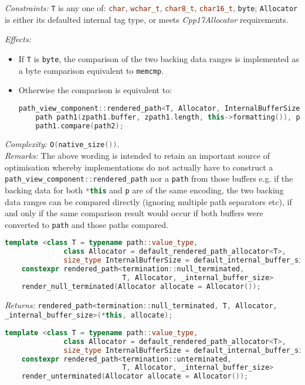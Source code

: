 \documentclass[11pt]{article}
\newcommand{\code}[2][cpp]{\lstinline[language=#1,basicstyle=\small\ttfamily]{#2}}
\newcommand{\desc}[1]{\textit{#1}}
\newcommand{\constraints}{\desc{Constraints: }}
\newcommand{\effects}{\desc{Effects: }}
\newcommand{\returns}{\desc{Returns: }}
\newcommand{\remarks}{\desc{Remarks: }}
\newcommand{\complexity}{\desc{Complexity: }}
\begin{document}
\constraints \code{T} is any one of: \code{char}, \code{wchar_t}, \code{char8_t}, \code{char16_t}, \code{byte}; \code{Allocator} is either its defaulted internal tag type, or meets \emph{Cpp17Allocator} requirements.

\effects
\begin{itemize}
    \item If \code{T} is \code{byte}, the comparison of the two backing data ranges is implemented as a byte comparison equivalent to \code{memcmp}.
    \item Otherwise the comparison is equivalent to:
    \begin{lstlisting}[language=cpp]
    path_view_component::rendered_path<T, Allocator, InternalBufferSize> zpath1(*this), zpath2(p);
    path path1(zpath1.buffer, zpath1.length, this->formatting()), path2(zpath2.buffer, zpath2.length, p.formatting());
    path1.compare(path2);
    \end{lstlisting}
\end{itemize}

\complexity \code{O(native_size())}.\\

\remarks{The above wording is intended to retain an important source of optimisation whereby implementations do not actually have to construct a \code{path_view_component::rendered_path} nor a \code{path} from those buffers e.g. if the backing data for both \code{*this} and \code{p} are of the same encoding, the two backing data ranges can be compared directly (ignoring multiple path separators etc), if and only if the same comparison result would occur if both buffers were converted to \code{path} and those paths compared.}

\color{darkgreen}


\begin{lstlisting}[language=cpp]
    template <class T = typename path::value_type,
              class Allocator = default_rendered_path_allocator<T>,
              size_type InternalBufferSize = default_internal_buffer_size>
    constexpr rendered_path<termination::null_terminated,
                            T, Allocator, _internal_buffer_size>
    render_null_terminated(Allocator allocate = Allocator());
\end{lstlisting}

\returns \code{rendered_path<termination::null_terminated, T, Allocator, _internal_buffer_size>(*this, allocate);}


\begin{lstlisting}[language=cpp]
    template <class T = typename path::value_type,
              class Allocator = default_rendered_path_allocator<T>,
              size_type InternalBufferSize = default_internal_buffer_size>
    constexpr rendered_path<termination::unterminated,
                            T, Allocator, _internal_buffer_size>
    render_unterminated(Allocator allocate = Allocator());
\end{lstlisting}
\end{document}
